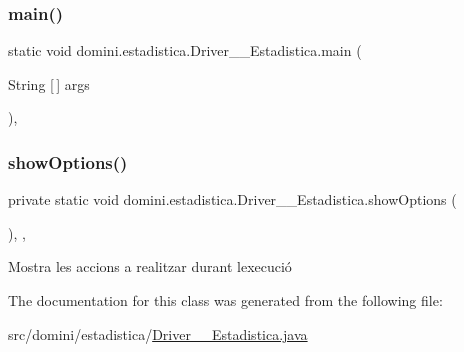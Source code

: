 \subsubsection{\texorpdfstring{main()}{main()}}
{\footnotesize\ttfamily static void domini.\+estadistica.\+Driver\+\_\+\+\_\+\+Estadistica.\+main (\begin{DoxyParamCaption}\item[{String \mbox{[}$\,$\mbox{]}}]{args }\end{DoxyParamCaption})\hspace{0.3cm}{\ttfamily [inline]}, {\ttfamily [static]}}

\mbox{\label{classdomini_1_1estadistica_1_1Driver____Estadistica_ab42f06b8996094e10bd087ccf2f749e7}} 
\subsubsection{\texorpdfstring{show\+Options()}{showOptions()}}
{\footnotesize\ttfamily private static void domini.\+estadistica.\+Driver\+\_\+\+\_\+\+Estadistica.\+show\+Options (\begin{DoxyParamCaption}{ }\end{DoxyParamCaption})\hspace{0.3cm}{\ttfamily [inline]}, {\ttfamily [static]}, {\ttfamily [private]}}



Mostra les accions a realitzar durant l\textquotesingle{}execució 



The documentation for this class was generated from the following file\+:\begin{DoxyCompactItemize}
\item 
src/domini/estadistica/\hyperlink{Driver____Estadistica_8java}{Driver\+\_\+\+\_\+\+Estadistica.\+java}\end{DoxyCompactItemize}
